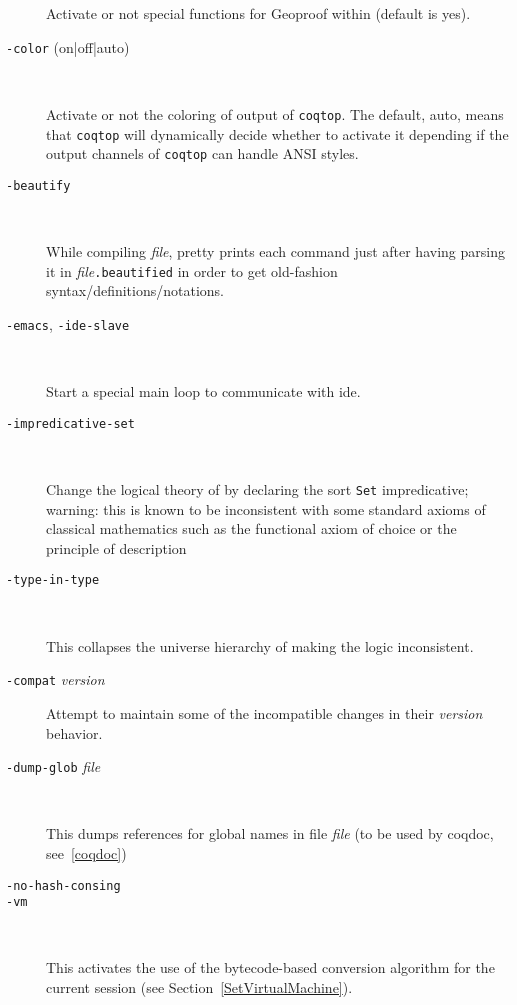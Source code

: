 \begin{description}
  Activate or not special functions for Geoproof within {\CoqIDE} (default is yes).

\item[{\tt -color} (on|off|auto)]\

  Activate or not the coloring of output of {\tt coqtop}. The default, auto,
  means that {\tt coqtop} will dynamically decide whether to activate it
  depending if the output channels of {\tt coqtop} can handle ANSI styles.

\item[{\tt -beautify}]\ 

  While compiling {\em file}, pretty prints each command just after having parsing
  it in {\em file}{\tt .beautified} in order to get old-fashion
  syntax/definitions/notations.

\item[{\tt -emacs}, {\tt -ide-slave}]\ 

  Start a special main loop to communicate with ide.

\item[{\tt -impredicative-set}]\ 

  Change the logical theory of {\Coq} by declaring the sort {\tt Set}
  impredicative; warning: this is known to be inconsistent with
  some standard axioms of classical mathematics such as the functional
  axiom of choice or the principle of description

\item[{\tt -type-in-type}]\

  This collapses the universe hierarchy of {\Coq} making the logic inconsistent.

\item[{\tt -compat} {\em version}] \mbox{}

  Attempt to maintain some of the incompatible changes in their {\em version}
  behavior.

\item[{\tt -dump-glob} {\em file}]\ 

  This dumps references for global names in file {\em file}
  (to be used by coqdoc, see~\ref{coqdoc})

\item[{\tt -no-hash-consing}] \mbox{}

\item[{\tt -vm}]\ 

  This activates the use of the bytecode-based conversion algorithm
  for the current session (see Section~\ref{SetVirtualMachine}).


\end{description}
